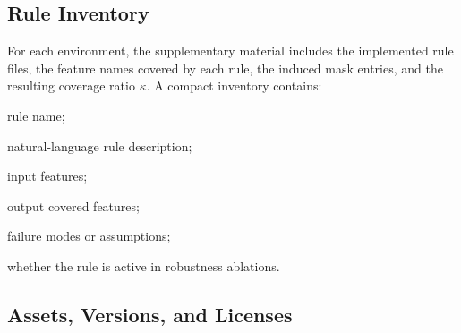 \documentclass{article}
\theoremstyle{plain}
\theoremstyle{definition}
\theoremstyle{remark}
\begin{document}
\subsection{Rule Inventory}
\label{app:rules}

For each environment, the supplementary material includes the implemented rule files, the feature names covered by each rule, the induced mask entries, and the resulting coverage ratio $\kappa$. A compact inventory contains:
\begin{enumerate*}[label={\roman*) }, itemjoin={; \quad}]
  \item rule name;
  \item natural-language rule description;
  \item input features;
  \item output covered features;
  \item failure modes or assumptions;
  \item whether the rule is active in robustness ablations.
\end{enumerate*}

\subsection{Assets, Versions, and Licenses}
\label{app:assets}
\end{document}
